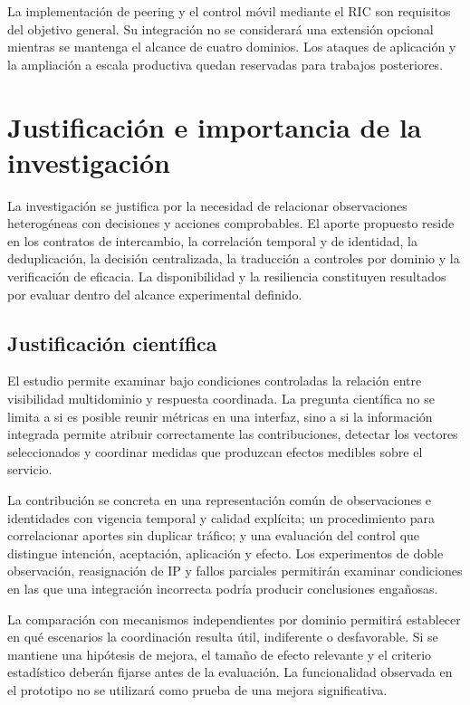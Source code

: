 La implementación de peering y el control móvil mediante el RIC son requisitos del objetivo general. Su integración no se considerará una extensión opcional mientras se mantenga el alcance de cuatro dominios. Los ataques de aplicación y la ampliación a escala productiva quedan reservadas para trabajos posteriores.

\section{Justificación e importancia de la investigación}

La investigación se justifica por la necesidad de relacionar observaciones heterogéneas con decisiones y acciones comprobables. El aporte propuesto reside en los contratos de intercambio, la correlación temporal y de identidad, la deduplicación, la decisión centralizada, la traducción a controles por dominio y la verificación de eficacia. La disponibilidad y la resiliencia constituyen resultados por evaluar dentro del alcance experimental definido.

\subsection{Justificación científica}

El estudio permite examinar bajo condiciones controladas la relación entre visibilidad multidominio y respuesta coordinada. La pregunta científica no se limita a si es posible reunir métricas en una interfaz, sino a si la información integrada permite atribuir correctamente las contribuciones, detectar los vectores seleccionados y coordinar medidas que produzcan efectos medibles sobre el servicio.

La contribución se concreta en una representación común de observaciones e identidades con vigencia temporal y calidad explícita; un procedimiento para correlacionar aportes sin duplicar tráfico; y una evaluación del control que distingue intención, aceptación, aplicación y efecto. Los experimentos de doble observación, reasignación de IP y fallos parciales permitirán examinar condiciones en las que una integración incorrecta podría producir conclusiones engañosas.

La comparación con mecanismos independientes por dominio permitirá establecer en qué escenarios la coordinación resulta útil, indiferente o desfavorable. Si se mantiene una hipótesis de mejora, el tamaño de efecto relevante y el criterio estadístico deberán fijarse antes de la evaluación. La funcionalidad observada en el prototipo no se utilizará como prueba de una mejora significativa.

